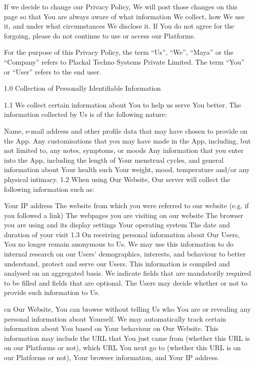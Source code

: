 If we decide to change our Privacy Policy, We will post those changes on this page so that You are always aware of what information We collect, how We use it, and under what circumstances We disclose it. If You do not agree for the forgoing, please do not continue to use or access our Platforms.

For the purpose of this Privacy Policy, the term “Us”, “We”, “Maya” or the “Company” refers to Plackal Techno Systems Private Limited. The term “You” or “User” refers to the end user.

 

1.0      Collection of Personally Identifiable Information

1.1      We collect certain information about You to help us serve You better. The information collected by Us is of the following nature:

Name, e-mail address and other profile data that may have chosen to provide on the App.
Any customisations that you may have made in the App, including, but not limited to, any notes, symptoms, or moods
Any information that you enter into the App, including the length of Your menstrual cycles, and general information about Your health such Your weight, mood, temperature and/or any physical intimacy.
1.2      When using Our Website, Our server will collect the following information such as:

Your IP address
The website from which you were referred to our website (e.g. if you followed a link)
The webpages you are visiting on our website
The browser you are using and its display settings
Your operating system
The date and duration of your visit
1.3      On receiving personal information about Our Users, You no longer remain anonymous to Us. We may use this information to do internal research on our Users’ demographics, interests, and behaviour to better understand, protect and serve our Users. This information is compiled and analysed on an aggregated basis. We indicate fields that are mandatorily required to be filled and fields that are optional. The Users may decide whether or not to provide such information to Us.

cn Our Website, You can browse without telling Us who You are or revealing any personal information about Yourself. We may automatically track certain information about You based on Your behaviour on Our Website. This information may include the URL that You just came from (whether this URL is on our Platforms or not), which URL You next go to (whether this URL is on our Platforms or not), Your browser information, and Your IP address.

